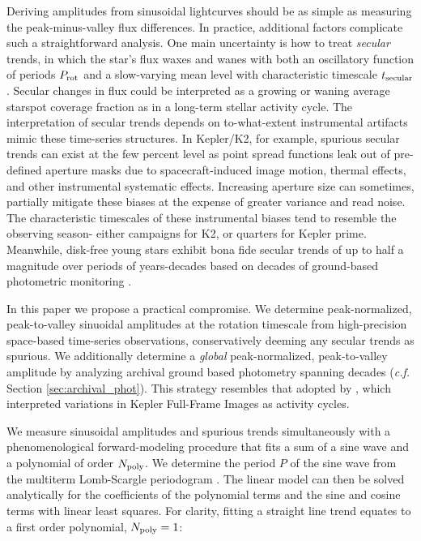 \documentclass[revtex4]{emulateapj}%
\begin{document}
Deriving amplitudes from sinusoidal lightcurves should be as simple as measuring the peak-minus-valley flux differences.  In practice, additional factors complicate such a straightforward analysis.  One main uncertainty is how to treat \emph{secular} trends, in which the star's flux waxes and wanes with both an oscillatory function of periods $P_{\rm rot}$ and a slow-varying mean level with characteristic timescale $t_{\rm secular}$.  Secular changes in flux could be interpreted as a growing or waning average starspot coverage fraction as in a long-term stellar activity cycle.  The interpretation of secular trends depends on to-what-extent instrumental artifacts mimic these time-series structures.  In Kepler/K2, for example, spurious secular trends can exist at the few percent level as point spread functions leak out of pre-defined aperture masks due to spacecraft-induced image motion, thermal effects, and other instrumental systematic effects.  Increasing aperture size can sometimes, partially mitigate these biases at the expense of greater variance and read noise.  The characteristic timescales of these instrumental biases tend to resemble the observing season- either campaigns for K2, or quarters for Kepler prime.  Meanwhile, disk-free young stars exhibit bona fide secular trends of up to half a magnitude over periods of years-decades based on decades of ground-based photometric monitoring \citep{grankin08}.

In this paper we propose a practical compromise. We determine peak-normalized, peak-to-valley sinuoidal amplitudes at the rotation timescale from high-precision space-based time-series observations, conservatively deeming any secular trends as spurious.  We additionally determine a \emph{global} peak-normalized, peak-to-valley amplitude by analyzing archival ground based photometry spanning decades (\emph{c.f.} Section \ref{sec:archival_phot}).  This strategy resembles that adopted by \citet{2017ApJ...851..116M}, which interpreted variations in Kepler Full-Frame Images as activity cycles.

We measure sinusoidal amplitudes and spurious trends simultaneously with a phenomenological forward-modeling procedure that fits a sum of a sine wave and a polynomial of order $N_{\rm poly}$.  We determine the period $P$ of the sine wave from the multiterm Lomb-Scargle periodogram \citep{ivezic14}.  The linear model can then be solved analytically for the coefficients of the polynomial terms and the sine and cosine terms with linear least squares.  For clarity, fitting a straight line trend equates to a first order polynomial, $N_{\rm poly}=1$:
\end{document}
